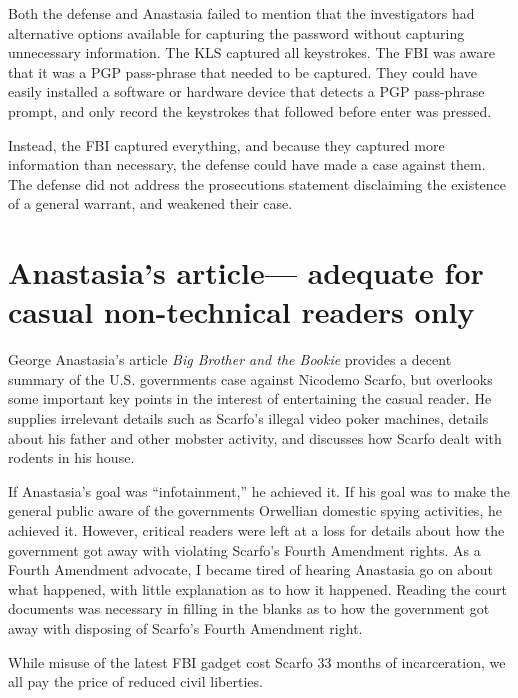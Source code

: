 ﻿\documentclass[12pt,titlepage]{article}             %
\begin{document}
  Both the defense and Anastasia failed to mention that the
  investigators had alternative options available for capturing the
  password without capturing unnecessary information.  The KLS
  captured all keystrokes.  The FBI was aware that it was a PGP
  pass-phrase that needed to be captured.  They could have easily
  installed a software or hardware device that detects a PGP
  pass-phrase prompt, and only record the keystrokes that followed
  before enter was pressed.  
  
  Instead, the FBI captured everything, and because they captured more
  information than necessary, the defense could have made a case
  against them.  The defense did not address the prosecutions
  statement disclaiming the existence of a general warrant, and
  weakened their case.

  \section{Anastasia's article--- adequate for casual non-technical readers only}
  
  George Anastasia's article \textit{Big Brother and the Bookie}
  provides a decent summary of the U.S. governments case against
  Nicodemo Scarfo, but overlooks some important key points in the
  interest of entertaining the casual reader.  He supplies irrelevant
  details such as Scarfo's illegal video poker machines, details about
  his father and other mobster activity, and discusses how Scarfo
  dealt with rodents in his house.
  
  If Anastasia's goal was ``infotainment,'' he achieved it.  If his
  goal was to make the general public aware of the governments
  Orwellian domestic spying activities, he achieved it.  However,
  critical readers were left at a loss for details about how the
  government got away with violating Scarfo's Fourth Amendment rights.
  As a Fourth Amendment advocate, I became tired of hearing Anastasia
  go on about what happened, with little explanation as to how it
  happened.  Reading the court documents was necessary in filling in
  the blanks as to how the government got away with disposing of
  Scarfo's Fourth Amendment right.
  
  While misuse of the latest FBI gadget cost Scarfo 33 months of
  incarceration, we all pay the price of reduced civil liberties.
\end{document}
